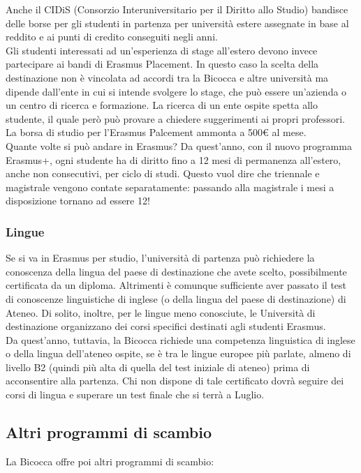 Anche il CIDiS (Consorzio Interuniversitario per il Diritto allo Studio) bandisce delle borse per gli studenti in partenza per università estere assegnate in base al reddito e ai punti di credito conseguiti negli anni.\\
Gli studenti interessati ad un'esperienza di stage all'estero devono invece partecipare ai bandi di Erasmus Placement. In questo caso la scelta della destinazione non è vincolata ad accordi tra la Bicocca e altre università ma dipende dall'ente in cui si intende svolgere lo stage, che può essere un'azienda o un centro di ricerca e formazione. La ricerca di un ente ospite spetta allo studente, il quale però può provare a chiedere suggerimenti ai propri professori.\\
La borsa di studio per l'Erasmus Palcement ammonta a 500€ al mese.\\
Quante volte si può andare in Erasmus? Da quest'anno, con il nuovo programma Erasmus+, ogni studente ha di diritto fino a 12 mesi di permanenza all'estero, anche non consecutivi, per ciclo di studi. Questo vuol dire che triennale e magistrale vengono contate separatamente: passando alla magistrale i mesi a disposizione tornano ad essere 12!

\subsubsection{Lingue}
Se si va in Erasmus per studio, l'università di partenza può richiedere la conoscenza della lingua del paese di destinazione che avete scelto, possibilmente certificata da un diploma. Altrimenti è comunque sufficiente aver passato il test di conoscenze linguistiche di inglese (o della lingua del paese di destinazione) di Ateneo. Di solito, inoltre, per le lingue meno conosciute, le Università di destinazione organizzano dei corsi specifici destinati agli studenti Erasmus.\\
Da quest'anno, tuttavia, la Bicocca richiede una competenza linguistica di inglese o della lingua dell'ateneo ospite, se è tra le lingue europee più parlate, almeno di livello B2 (quindi più alta di quella del test iniziale di ateneo) prima di acconsentire alla partenza. Chi non dispone di tale certificato dovrà seguire dei corsi di lingua e superare un test finale che si terrà a Luglio.


\subsection{Altri programmi di scambio}
La Bicocca offre poi altri programmi di scambio:

